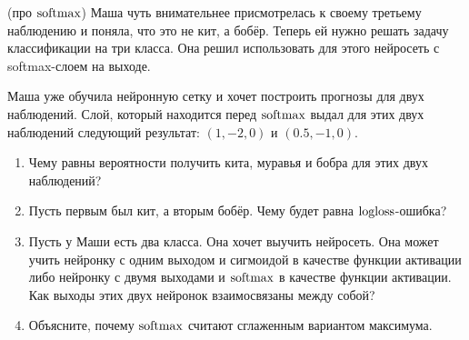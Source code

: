 \begin{problem}{(про $\operatorname{softmax}$)}
	Маша чуть внимательнее присмотрелась к своему третьему наблюдению и поняла, что это не кит, а бобёр. Теперь ей нужно решать задачу классификации на три класса. Она решил использовать для этого нейросеть с softmax-слоем на выходе. 
	
	Маша уже обучила нейронную сетку и хочет построить прогнозы для двух наблюдений. Слой, который находится перед $\operatorname{softmax}$ выдал для этих двух наблюдений следующий результат: $(1, -2, 0)$ и $(0.5, -1, 0)$.
	
	\begin{enumerate}
		\item Чему равны вероятности получить кита, муравья и бобра для этих двух наблюдений? 
		
		\item Пусть первым был кит, а вторым бобёр.  Чему будет равна $\operatorname{logloss}$-ошибка? 
		
		\item Пусть у Маши есть два класса. Она хочет выучить нейросеть. Она может учить нейронку с одним выходом и сигмоидой в качестве функции активации либо нейронку с двумя выходами и $\operatorname{softmax}$ в качестве функции активации. Как выходы этих двух нейронок взаимосвязаны между собой? 
		
		\item  Объясните, почему $\operatorname{softmax}$  считают сглаженным вариантом максимума.
	\end{enumerate}
\end{problem}








%
%
%
%
%


